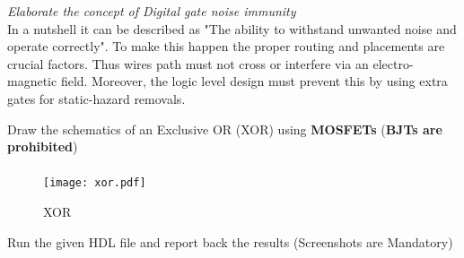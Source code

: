 \documentclass[16pt,answers]{exam}
\begin{document}
\begin{questions}
\begin{parts}
\end{parts}
\question\textit{ Elaborate the concept of Digital gate noise immunity}
\\
In a nutshell it can be described as "The ability to withstand unwanted noise and operate correctly". To make this happen the proper routing and placements are crucial factors. Thus wires path must not cross or interfere via an electro-magnetic field. Moreover, the logic level design must prevent this by using extra gates for static-hazard removals.



\question Draw the schematics of an Exclusive OR (XOR) using \textbf{MOSFETs} (\textbf{BJTs are prohibited})
\paragraph{}
\begin{figure}[H]
 	\centering
\texttt{[image: xor.pdf]}
\caption{XOR}

\end{figure}


\question Run the given HDL file and report back the results (Screenshots are Mandatory)
\paragraph{}


\begin{figure}[H]


\end{figure}
\end{questions}
\end{document}

